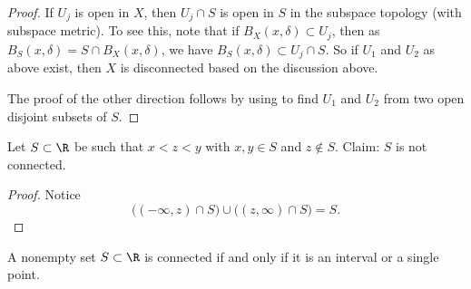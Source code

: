 \documentclass[12pt]{book}
\begin{document}
\begin{proof}
If $U_j$ is open in $X$,
then $U_j \cap S$ is open in $S$ in the subspace topology (with subspace
metric).
To see this,
note that if $B_X(x,\delta) \subset U_j$, then as
$B_S(x,\delta) = S \cap B_X(x,\delta)$,
we have $B_S(x,\delta) \subset U_j \cap S$.
So if $U_1$ and $U_2$ as above exist, then
$X$ is disconnected based on the discussion above.

The proof of the other direction follows by using
 to find $U_1$ and $U_2$ from two
open disjoint subsets of $S$.
\end{proof}

\begin{example}
Let $S \subset \R$ be such that $x < z < y$ with $x,y \in S$
and $z \notin S$.
Claim: $S$ is not connected.
\begin{proof}  Notice
\begin{equation*}
\bigl( (-\infty,z) \cap S \bigr)
\cup
\bigl( (z,\infty) \cap S \bigr)
= S .
\end{equation*}
\end{proof}
\end{example}

\begin{prop}
A nonempty set $S \subset \R$ is connected if and only if it is
an interval or a single point.
\end{prop}
\end{document}
